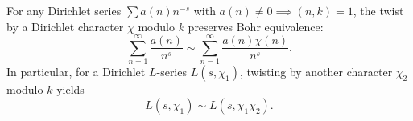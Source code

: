 For any Dirichlet series $\sum a(n) n^{-s}$ with $a(n) \neq 0 \implies (n, k) = 1$, the twist by a Dirichlet character $\chi$ modulo $k$ preserves Bohr equivalence:
$$
\sum_{n=1}^\infty \frac{a(n)}{n^s} \sim \sum_{n=1}^\infty \frac{a(n)\chi(n)}{n^s}.
$$
In particular, for a Dirichlet $L$-series $L(s,\chi_1)$, twisting by another character $\chi_2$ modulo $k$ yields
$$
L(s,\chi_1) \sim L(s,\chi_1\chi_2).
$$
